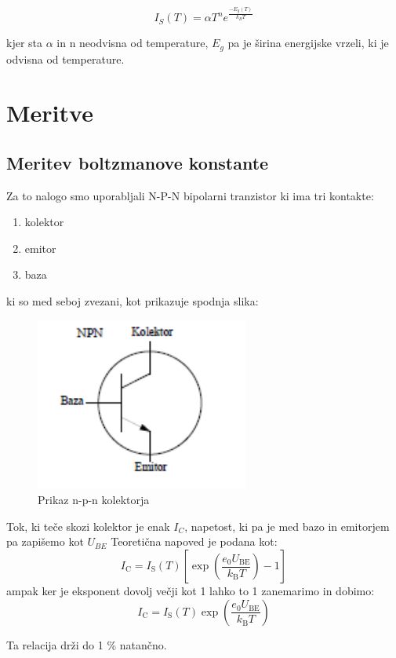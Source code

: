 \documentclass[11pt, a4paper]{article}
\theoremstyle{definition}
\theoremstyle{example}
\theoremstyle{izrek}
\begin{document}
$$I_S(T)= \alpha T^n e^{\frac{-E_g (T)}{k_B T}}$$

kjer sta $\alpha$ in n neodvisna od temperature, $E_g$ pa je širina energijske vrzeli, ki je odvisna od temperature. 
\section{Meritve}

\subsection{Meritev boltzmanove konstante}
Za to nalogo smo uporabljali N-P-N bipolarni tranzistor ki ima tri kontakte:
\begin{enumerate}
\item kolektor
\item emitor
\item baza
\end{enumerate}
ki so med seboj zvezani, kot prikazuje spodnja slika:
\begin{figure}[H]
    \centering
    \includegraphics[width=7cm]{N-p-n.png}
    \caption{Prikaz n-p-n kolektorja}
\end{figure}

Tok, ki teče skozi kolektor je enak $I_C$, napetost, ki pa je med bazo in emitorjem pa zapišemo kot $U_{BE}$ 
Teoretična napoved je podana kot: 
$$I_{\mathrm{C}}=I_{\mathrm{S}}(T)\left[\exp \left(\frac{e_{0} U_{\mathrm{BE}}}{k_{\mathrm{B}} T}\right)-1\right]$$
ampak ker je eksponent dovolj večji kot 1 lahko to 1 zanemarimo in dobimo:
$$I_{\mathrm{C}}=I_{\mathrm{S}}(T)\exp \left(\frac{e_{0} U_{\mathrm{BE}}}{k_{\mathrm{B}} T}\right)$$

Ta relacija drži do 1 \% natančno.
\end{document}
